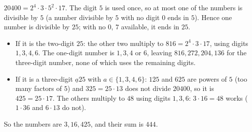 $20400=2^4\cdot3\cdot5^2\cdot17$. The digit $5$ is used once, so at most one of the numbers is divisible by $5$ (a number divisible by $5$ with no digit $0$ ends in $5$). Hence one number is divisible by $25$; with no $0$, $7$ available, it ends in $25$.
\begin{itemize}
\item If it is the two-digit $25$: the other two multiply to $816=2^4\cdot3\cdot17$, using digits $1,3,4,6$. The one-digit number is $1,3,4$ or $6$, leaving $816,272,204,136$ for the three-digit number, none of which uses the remaining digits.
\item If it is a three-digit $\underline{a}25$ with $a\in\{1,3,4,6\}$: $125$ and $625$ are powers of $5$ (too many factors of $5$) and $325=25\cdot13$ does not divide $20400$, so it is $425=25\cdot17$. The others multiply to $48$ using digits $1,3,6$: $3\cdot16=48$ works ($1\cdot36$ and $6\cdot13$ do not).
\end{itemize}
So the numbers are $3,16,425$, and their sum is $\boxed{444}$.
